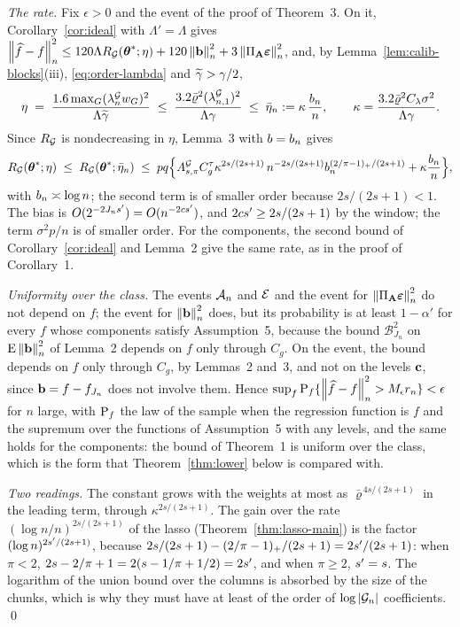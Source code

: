 \emph{The rate.} Fix $\epsilon > 0$ and the event of the proof of Theorem~3.
On it, Corollary~\ref{cor:ideal} with $\Lambda' = \Lambda$ gives
$\left\lVert \widehat{f}-f \right\rVert_{n}^{2} \le 120\Lambda R_{\mathcal{G}}(\boldsymbol{\theta}^{*};\eta) +
120\left\lVert \mathbf{b} \right\rVert_{n}^{2} + 3\left\lVert \Pi_{\mathbf{A}}\boldsymbol{\varepsilon} \right\rVert_{n}^{2}$, and, by
Lemma~\ref{lem:calib-blocks}(iii), \eqref{eq:order-lambda} and
$\widetilde{\gamma} > \gamma/2$,
\[
  \eta \;=\; \frac{1.6\max_{G}(\lambda^{\mathcal{G}}_{n} w_{G})^{2}}{\Lambda\widetilde{\gamma}}
  \;\le\; \frac{3.2\bar\varrho^{2}(\lambda^{\mathcal{G}}_{n,1})^{2}}{\Lambda\gamma}
  \;\le\; \bar\eta_{n} := \kappa\,\frac{b_{n}}{n},
  \qquad
  \kappa = \frac{3.2\bar\varrho^{2}C_{\lambda}\sigma^{2}}{\Lambda\gamma}.
\]
Since $R_{\mathcal{G}}$ is nondecreasing in $\eta$, Lemma~3 with $b = b_{n}$ gives
\[
  R_{\mathcal{G}}(\boldsymbol{\theta}^{*};\eta) \;\le\; R_{\mathcal{G}}(\boldsymbol{\theta}^{*};\bar\eta_{n})
  \;\le\; pq\Bigl\{A^{\mathcal{G}}_{s,\pi} C_g^{\tau}\kappa^{2s/(2s+1)}\,n^{-2s/(2s+1)}
  b_{n}^{(2/\pi-1)_{+}/(2s+1)} + \kappa\frac{b_{n}}{n}\Bigr\},
\]
with $b_{n} \asymp \log n$; the second term is of smaller order because
$2s/(2s+1) < 1$. The bias is $O(2^{-2J_ns'}) = O(n^{-2cs'})$, and
$2cs' \ge 2s/(2s+1)$ by the window; the term $\sigma^{2}p/n$ is of smaller
order. For the components, the second bound of Corollary~\ref{cor:ideal} and
Lemma~2 give the same rate, as in the proof of Corollary~1.

\emph{Uniformity over the class.} The events $\mathcal{A}_{n}$ and $\mathcal{E}$ and the
event for $\left\lVert \Pi_{\mathbf{A}}\boldsymbol{\varepsilon} \right\rVert_{n}^{2}$ do not depend on $f$; the event for
$\left\lVert \mathbf{b} \right\rVert_{n}^{2}$ does, but its probability is at least $1-\alpha'$ for every
$f$ whose components satisfy Assumption~5, because the bound
$\mathcal{B}_{J_n}^{2}$ on $\mathrm{E}\left\lVert \mathbf{b} \right\rVert_{n}^{2}$ of Lemma~2 depends on $f$ only
through $C_g$. On the event, the bound depends on $f$ only through $C_g$, by
Lemmas~2 and~3, and not on the levels $\mathbf{c}$, since $\mathbf{b} = f - f_{J_n}$ does
not involve them. Hence
$\sup_{f}\mathrm{P}_{f}\{\left\lVert \widehat{f}-f \right\rVert_{n}^{2} > M_\epsilon r_n\} < \epsilon$
for $n$ large, with $\mathrm{P}_{f}$ the law of the sample when the regression
function is $f$ and the supremum over the functions of Assumption~5 with any
levels, and the same holds for the components: the bound of Theorem~1 is
uniform over the class, which is the form that Theorem~\ref{thm:lower} below
is compared with.

\emph{Two readings.} The constant grows with the weights at most as
$\bar\varrho^{\,4s/(2s+1)}$ in the leading term, through
$\kappa^{2s/(2s+1)}$. The gain over the rate $(\log n/n)^{2s/(2s+1)}$ of the
lasso (Theorem~\ref{thm:lasso-main}) is the factor $(\log n)^{2s'/(2s+1)}$,
because $2s/(2s+1) - (2/\pi-1)_{+}/(2s+1) = 2s'/(2s+1)$: when $\pi < 2$,
$2s - 2/\pi + 1 = 2(s - 1/\pi + 1/2) = 2s'$, and when $\pi \ge 2$,
$s' = s$. The logarithm of the union bound over the columns is absorbed by
the size of the chunks, which is why they must have at least of the order of
$\log|\mathcal{G}_{n}|$ coefficients. \qed

